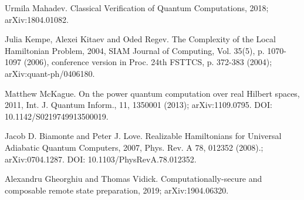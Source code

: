 \documentclass{article}
\theoremstyle{definition}
\begin{document}
\begin{thebibliography}{9}
	Urmila Mahadev.
	\newblock Classical Verification of Quantum Computations, 2018;
	\newblock arXiv:1804.01082.

	Julia Kempe, Alexei Kitaev and Oded Regev.
	\newblock The Complexity of the Local Hamiltonian Problem, 2004,
	\newblock SIAM Journal of Computing, Vol. 35(5), p. 1070-1097 (2006),
		conference version in Proc. 24th FSTTCS, p. 372-383 (2004);
	\newblock arXiv:quant-ph/0406180.

	Matthew McKague.
	\newblock On the power quantum computation over real Hilbert spaces, 2011,
	\newblock Int. J. Quantum Inform., 11, 1350001 (2013);
	\newblock arXiv:1109.0795.
	\newblock DOI: 10.1142/S0219749913500019.
	
	Jacob D. Biamonte and Peter J. Love.
	\newblock Realizable Hamiltonians for Universal Adiabatic Quantum Computers, 2007,
	\newblock Phys. Rev. A 78, 012352 (2008).;
	\newblock arXiv:0704.1287.
	\newblock DOI: 10.1103/PhysRevA.78.012352.

	Alexandru Gheorghiu and Thomas Vidick.
	\newblock Computationally-secure and composable remote state preparation, 2019;
	\newblock arXiv:1904.06320.

\end{thebibliography}
\end{document}
